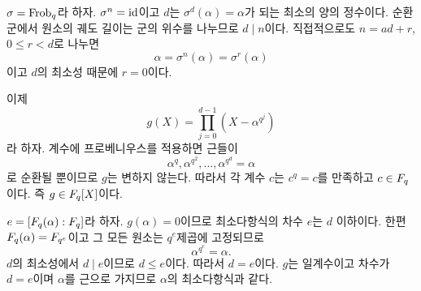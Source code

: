 \begin{solution}
$\sigma=\operatorname{Frob}_q$라 하자. $\sigma^n=\operatorname{id}$이고 $d$는 $\sigma^d(\alpha)=\alpha$가 되는 최소의 양의 정수이다. 순환군에서 원소의 궤도 길이는 군의 위수를 나누므로 $d\mid n$이다. 직접적으로도 $n=ad+r$, $0\le r<d$로 나누면
\[
  \alpha=\sigma^n(\alpha)=\sigma^r(\alpha)
\]
이고 $d$의 최소성 때문에 $r=0$이다.

이제
\[
  g(X)=\prod_{j=0}^{d-1}(X-\alpha^{q^j})
\]
라 하자. 계수에 프로베니우스를 적용하면 근들이
\[
  \alpha^q,\alpha^{q^2},\dots,
  \alpha^{q^d}=\alpha
\]
로 순환될 뿐이므로 $g$는 변하지 않는다. 따라서 각 계수 $c$는 $c^q=c$를 만족하고 $c\in F_q$이다. 즉 $g\in F_q[X]$이다.

$e=[F_q(\alpha):F_q]$라 하자. $g(\alpha)=0$이므로 최소다항식의 차수 $e$는 $d$ 이하이다. 한편 $F_q(\alpha)=F_{q^e}$이고 그 모든 원소는 $q^e$제곱에 고정되므로
\[
  \alpha^{q^e}=\alpha.
\]
$d$의 최소성에서 $d\mid e$이므로 $d\le e$이다. 따라서 $d=e$이다. $g$는 일계수이고 차수가 $d=e$이며 $\alpha$를 근으로 가지므로 $\alpha$의 최소다항식과 같다.
\end{solution}
